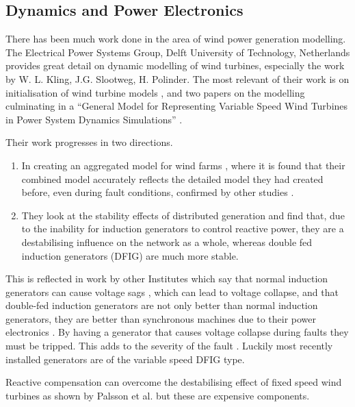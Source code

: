 \documentclass[a4paper,oneside,12pt]{report}
\begin{document}
\subsection{Dynamics and Power Electronics}

There has been much work done in the area of wind power generation modelling. The Electrical Power Systems Group, Delft University of Technology, Netherlands provides great detail on dynamic modelling of wind turbines, especially the work by W. L. Kling, J.G. Slootweg, H. Polinder. The most relevant of their work is on initialisation of wind turbine models \cite{Slootweg2001}, and two papers on the modelling \cite{Slootweg2001a, Slootweg2001b} culminating in a “General Model for Representing Variable Speed Wind Turbines in Power System Dynamics Simulations” \cite{Slootweg2003a}.

Their work progresses in two directions.

\begin{enumerate}
\item In creating an aggregated model for wind farms \cite{Slootweg2003}, where it is found that their combined model accurately reflects the detailed model they had created before, even during fault conditions, confirmed by other studies \cite{Castro1996}.

\item They look at the stability effects of distributed generation \cite{Reza2003, Reza2004, Slootweg2002a, Voorden2001} and find that, due to the inability for induction generators to control reactive power, they are a destabilising influence on the network as a whole, whereas double fed induction generators (DFIG) are much more stable.
\end{enumerate}


This is reflected in work by other Institutes which say that normal induction generators can cause voltage sags \cite{Holdsworth2001}, which can lead to voltage collapse, and that double-fed induction generators are not only better than normal induction generators, they are better than synchronous machines due to their power electronics \cite{Usaola2001}. By having a generator that causes voltage collapse during faults they must be tripped. This adds to the severity of the fault \cite{Eriksen2005}. Luckily most recently installed generators are of the variable speed DFIG type.

Reactive compensation can overcome the destabilising effect of fixed speed wind turbines as shown by Palsson et al. \cite{Palsson2002} but these are expensive components.
\end{document}

